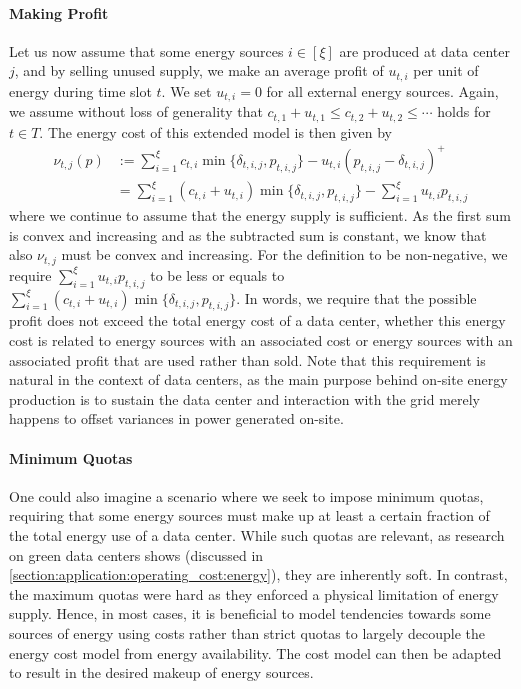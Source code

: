\paragraph{Making Profit} Let us now assume that some energy sources $i \in [\xi]$ are produced at data center $j$, and by selling unused supply, we make an average profit of $u_{t,i}$ per unit of energy during time slot $t$. We set $u_{t,i} = 0$ for all external energy sources. Again, we assume without loss of generality that $c_{t,1} + u_{t,1} \leq c_{t,2} + u_{t,2} \leq \cdots$ holds for $t \in T$. The energy cost of this extended model is then given by \begin{align*}
    \nu_{t,j}(p) &:= \sum_{i=1}^{\xi} c_{t,i} \min\{\delta_{t,i,j}, p_{t,i,j}\} - u_{t,i} (p_{t,i,j} - \delta_{t,i,j})^+ \\
                 &= \sum_{i=1}^{\xi} (c_{t,i} + u_{t,i}) \min\{\delta_{t,i,j}, p_{t,i,j}\} - \sum_{i=1}^{\xi} u_{t,i} p_{t,i,j}
\end{align*} where we continue to assume that the energy supply is sufficient. As the first sum is convex and increasing and as the subtracted sum is constant, we know that also $\nu_{t,j}$ must be convex and increasing. For the definition to be non-negative, we require $\sum_{i=1}^{\xi} u_{t,i} p_{t,i,j}$ to be less or equals to $\sum_{i=1}^{\xi} (c_{t,i} + u_{t,i}) \min\{\delta_{t,i,j}, p_{t,i,j}\}$. In words, we require that the possible profit does not exceed the total energy cost of a data center, whether this energy cost is related to energy sources with an associated cost or energy sources with an associated profit that are used rather than sold. Note that this requirement is natural in the context of data centers, as the main purpose behind on-site energy production is to sustain the data center and interaction with the grid merely happens to offset variances in power generated on-site.

\paragraph{Minimum Quotas} One could also imagine a scenario where we seek to impose minimum quotas, requiring that some energy sources must make up at least a certain fraction of the total energy use of a data center. While such quotas are relevant, as research on green data centers shows (discussed in \autoref{section:application:operating_cost:energy}), they are inherently soft. In contrast, the maximum quotas were hard as they enforced a physical limitation of energy supply. Hence, in most cases, it is beneficial to model tendencies towards some sources of energy using costs rather than strict quotas to largely decouple the energy cost model from energy availability. The cost model can then be adapted to result in the desired makeup of energy sources.


